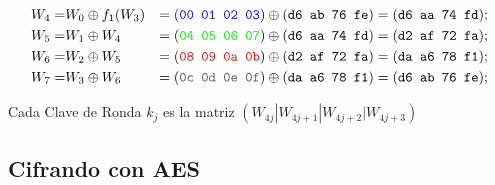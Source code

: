 \documentclass[10pt,t]{beamer}
\begin{document}
\begin{frame}
{            \begin{align*}
                W_4 = & W_0 \oplus f_1(W_3) & = (\textcolor{azul}{\texttt{00 01 02 03}}) \oplus (\texttt{d6 ab 76 fe}) = (\texttt{d6 aa 74 fd}); \\
                W_5 = & W_1  \oplus W_4     & =(\textcolor{verde}{\texttt{04 05 06 07}}) \oplus (\texttt{d6 aa 74 fd}) = (\texttt{d2 af 72 fa}); \\
                W_6 = & W_2  \oplus W_5     & = (\textcolor{rojo}{\texttt{08 09 0a 0b}}) \oplus (\texttt{d2 af 72 fa}) = (\texttt{da a6 78 f1}); \\
                W_7 = & W_3  \oplus W_6     & = (\textcolor{gris}{\texttt{0c 0d 0e 0f}}) \oplus (\texttt{da a6 78 f1}) = (\texttt{d6 ab 76 fe}); \\
            \end{align*}

            Cada Clave de Ronda $k_j$ es la matriz $(W_{4j} | W_{4j+1} | W_{4j+2} | W_{4j+3})$
        }
\end{frame}


\subsection{Cifrando con AES}
\end{document}
